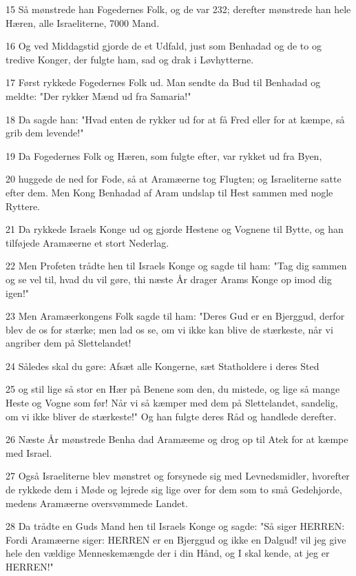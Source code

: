 \par 15 Så mønstrede han Fogedernes Folk, og de var 232; derefter mønstrede han hele Hæren, alle Israeliterne, 7000 Mand.
\par 16 Og ved Middagstid gjorde de et Udfald, just som Benhadad og de to og tredive Konger, der fulgte ham, sad og drak i Løvhytterne.
\par 17 Først rykkede Fogedernes Folk ud. Man sendte da Bud til Benhadad og meldte: "Der rykker Mænd ud fra Samaria!"
\par 18 Da sagde han: "Hvad enten de rykker ud for at få Fred eller for at kæmpe, så grib dem levende!"
\par 19 Da Fogedernes Folk og Hæren, som fulgte efter, var rykket ud fra Byen,
\par 20 huggede de ned for Fode, så at Aramæerne tog Flugten; og Israeliterne satte efter dem. Men Kong Benhadad af Aram undslap til Hest sammen med nogle Ryttere.
\par 21 Da rykkede Israels Konge ud og gjorde Hestene og Vognene til Bytte, og han tilføjede Aramæerne et stort Nederlag.
\par 22 Men Profeten trådte hen til Israels Konge og sagde til ham: "Tag dig sammen og se vel til, hvad du vil gøre, thi næste År drager Arams Konge op imod dig igen!"
\par 23 Men Aramæerkongens Folk sagde til ham: "Deres Gud er en Bjerggud, derfor blev de os for stærke; men lad os se, om vi ikke kan blive de stærkeste, når vi angriber dem på Slettelandet!
\par 24 Således skal du gøre: Afsæt alle Kongerne, sæt Statholdere i deres Sted
\par 25 og stil lige så stor en Hær på Benene som den, du mistede, og lige så mange Heste og Vogne som før! Når vi så kæmper med dem på Slettelandet, sandelig, om vi ikke bliver de stærkeste!" Og han fulgte deres Råd og handlede derefter.
\par 26 Næste År mønstrede Benha dad Aramæeme og drog op til Atek for at kæmpe med Israel.
\par 27 Også Israeliterne blev mønstret og forsynede sig med Levnedsmidler, hvorefter de rykkede dem i Møde og lejrede sig lige over for dem som to små Gedehjorde, medens Aramæerne oversvømmede Landet.
\par 28 Da trådte en Guds Mand hen til Israels Konge og sagde: "Så siger HERREN: Fordi Aramæerne siger: HERREN er en Bjerggud og ikke en Dalgud! vil jeg give hele den vældige Menneskemængde der i din Hånd, og I skal kende, at jeg er HERREN!"
